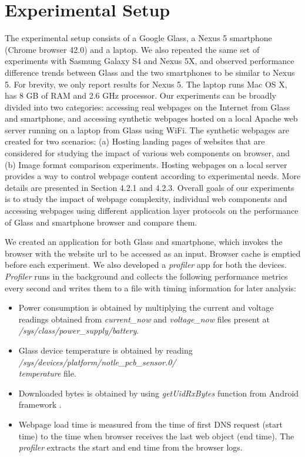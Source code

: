 \documentclass{sig-alternate-10pt}
\begin{document}
\section{Experimental Setup}
The experimental setup  consists of a Google Glass, a Nexus 5 smartphone (Chrome browser 42.0) and a laptop. We also repeated the same set of experiments with Sasmung Galaxy S4 and Nexus 5X, and  observed performance difference trends  between Glass and the two smartphones to be similar to Nexus 5. For brevity, we only report results  for  Nexus 5. The laptop runs Mac OS X, has 8 GB of RAM and 2.6 GHz processor.  Our experiments can be broadly divided into two categories: accessing real webpages on the Internet from Glass and smartphone, and accessing synthetic webpages hosted on a local Apache web server running on a laptop  from Glass using  WiFi.   The synthetic webpages are created for two scenarios: (a) Hosting  landing pages of websites that are considered for studying the impact of various web components on browser, and (b) Image format comparison experiments.  Hosting webpages on a local server provides a way to control webpage content according to experimental needs. More details are presented  in Section 4.2.1  and 4.2.3.   Overall goals of our experiments is to study the impact of webpage complexity, individual web components and accessing webpages using different application layer protocols  on the performance of Glass and smartphone browser and compare them.  


We created  an application for both Glass and smartphone, which invokes the browser  with the  website url to be accessed as an input.  Browser cache is emptied before each experiment. We also developed a \textit{profiler}   app for both the devices. \textit{Profiler}  runs in the background and collects  the following performance metrics every second and writes them to a file with timing information for later analysis:
\begin{itemize}
\item Power consumption is obtained by multiplying the current and voltage readings obtained from \textit{current\_now} and \textit{voltage\_now} files  present at  \textit{/sys/class/power\_supply/battery}. 


\item Glass device temperature  is obtained by reading \textit{/sys/devices/platform/notle\_pcb\_sensor.0/\\temperature} file.

\item Downloaded bytes is obtained by using \textit{getUidRxBytes} function from Android framework \cite{sdk}. \item  Webpage load time is measured from the time of first DNS request (start time) to the time when browser receives the last web object (end time). The \textit{profiler} extracts  the start and end time from the  browser logs.
\end{itemize}
 
\end{document}
